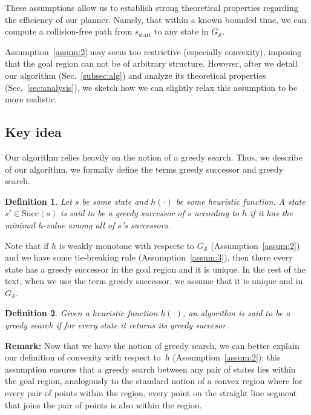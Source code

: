 \documentclass[letterpaper]{article} %
\newcommand{\calS}{\ensuremath{\mathcal{S}}\xspace}
\newcommand{\sStart}{\ensuremath{s_{\text{start}}\xspace}}
\newtheorem{definition}{Definition}
\begin{document}
These assumptions allow us to establish strong theoretical properties regarding the efficiency of our planner. Namely, that
within a known bounded time, we can compute a collision-free path from $\sStart$ to any state in $G_\calS$. 


Assumption~\ref{assum:2} may seem too restrictive (especially convexity), imposing that the goal region can not be of arbitrary structure. However, after we detail our algorithm (Sec.~\ref{subsec:alg}) and analyze its theoretical properties (Sec.~\ref{sec:analysis}), we sketch how we can slightly relax this assumption to be more realistic.


 
\subsection{Key idea}
\label{sec:key}
Our algorithm relies heavily on the notion of a greedy search.  Thus, we describe of our algorithm, we formally define the terms greedy successor and greedy search.

\vspace{2mm}
\begin{definition}
\label{def:greedy-suc}
	Let $s$ be some state and $h(\cdot)$ be some heuristic function.
	A state $s' \in \text{Succ}(s)$ is said to be a \emph{greedy} successor of $s$ according to $h$ if it has the minimal $h$-value among all of $s$'s successors.
\end{definition}
Note that 
if $h$ is weakly monotone with respecte to $G_\calS$
(Assumption~\ref{assum:2}) 
and we have some tie-breaking rule
(Assumption~\ref{assum:3}), then there every state has a greedy successor in the goal region and it is unique.  
In the rest of the text, when we use the term greedy successor, we assume that it is unique and in $G_\calS$.

\vspace{2mm}
\begin{definition}
	Given a heuristic function $h(\cdot)$,
	an algorithm is said to be a \emph{greedy search}	 if for every state it returns its greedy succesor.
\end{definition}

\textbf{Remark:} Now that we have the notion of greedy search, we can better explain our definition of convexity with respect to~$h$ (Assumption~\ref{assum:2});
this assumption ensures that a greedy search between any pair of states lies within the goal region, analogously to the standard notion of a convex   region where for every pair of points within the region, every point on the straight line segment that joins the pair of points is also within the region.
\end{document}
